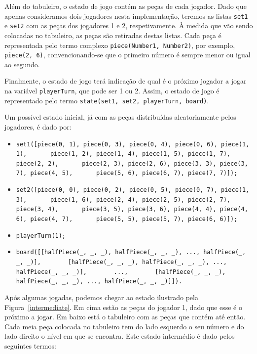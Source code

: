 \documentclass[a4paper]{article}
\begin{document}
Além do tabuleiro, o estado de jogo contém as peças de cada jogador. Dado que apenas consideramos dois jogadores nesta implementação, teremos as listas \verb|set1| e \verb|set2| com as peças dos jogadores 1 e 2, respetivamente. À medida que vão sendo colocadas no tabuleiro, as peças são retiradas destas listas. Cada peça é representada pelo termo complexo \verb|piece(Number1, Number2)|, por exemplo, \verb|piece(2, 6)|, convencionando-se que o primeiro número é sempre menor ou igual ao segundo.

Finalmente, o estado de jogo terá indicação de qual é o próximo jogador a jogar na variável \verb|playerTurn|, que pode ser 1 ou 2. Assim, o estado de jogo é representado pelo termo \verb|state(set1, set2, playerTurn, board)|.

Um possível estado inicial, já com as peças distribuídas aleatoriamente pelos jogadores, é dado por:
\begin{itemize}
\item 
\verb|set1([piece(0, 1), piece(0, 3), piece(0, 4), piece(0, 6), piece(1, 1),|\linebreak
\verb|      piece(1, 2), piece(1, 4), piece(1, 5), piece(1, 7), piece(2, 2),|\linebreak
\verb|      piece(2, 3), piece(2, 6), piece(3, 3), piece(3, 7), piece(4, 5),|\linebreak
\verb|      piece(5, 6), piece(6, 7), piece(7, 7)]);|
\item
\verb|set2([piece(0, 0), piece(0, 2), piece(0, 5), piece(0, 7), piece(1, 3),|\linebreak
\verb|      piece(1, 6), piece(2, 4), piece(2, 5), piece(2, 7), piece(3, 4),|\linebreak
\verb|      piece(3, 5), piece(3, 6), piece(4, 4), piece(4, 6), piece(4, 7),|\linebreak
\verb|      piece(5, 5), piece(5, 7), piece(6, 6)]);|
\item \verb|playerTurn(1);|	
\item 
\verb|board([[halfPiece(_, _, _), halfPiece(_, _, _), ..., halfPiece(_, _, _)],|\linebreak
\verb|       [halfPiece(_, _, _), halfPiece(_, _, _), ..., halfPiece(_, _, _)],|\linebreak
\verb|       ...,|\linebreak
\verb|       [halfPiece(_, _, _), halfPiece(_, _, _), ..., halfPiece(_, _, _)]]).|
\end{itemize}

Após algumas jogadas, podemos chegar ao estado ilustrado pela Figura~\ref{intermediate}. Em cima estão as peças do jogador 1, dado que esse é o próximo a jogar. Em baixo está o tabuleiro com as peças que contém até então. Cada meia peça colocada no tabuleiro tem do lado esquerdo o seu número e do lado direito o nível em que se encontra. Este estado intermédio é dado pelos seguintes termos:
\end{document}
